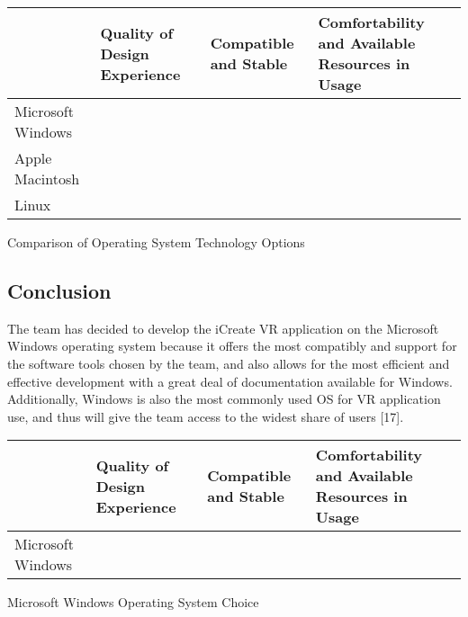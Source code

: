 \documentclass[letterpaper,10pt,onecolumn,compsoc]{IEEEtran}
\begin{document}

\begin{center}
\begin{tabular}{ | P{3.25cm} | P{4.5cm} | P{3.5cm} | P{4.5cm} | } 
 	\hline
 	 & Quality of Design Experience & Compatible and Stable & Comfortability and Available Resources in Usage \\ 
 	\hline
 	Microsoft Windows & & \checkmark & \checkmark \\ 
 	\hline
 	Apple Macintosh & \checkmark & &  \\ 
 	\hline
 	Linux & \checkmark &  & \\ 
 	\hline
\end{tabular}
\end{center}

\begin{center}
Comparison of Operating System Technology Options
\end{center}

\subsection{Conclusion}
The team has decided to develop the iCreate VR application on the Microsoft Windows operating system because it offers the most compatibly and support for the software tools chosen by the team, and also allows for the most efficient and effective development with a great deal of documentation available for Windows. Additionally, Windows is also the most commonly used OS for VR application use, and thus will give the team access to the widest share of users [17].


\begin{center}
\begin{tabular}{ | P{3.25cm} | P{4.5cm} | P{3.5cm} | P{4.5cm} | } 
 	\hline
 	 &  Quality of Design Experience & Compatible and Stable & Comfortability and Available Resources in Usage \\ 
 	\hline 		
 	Microsoft Windows &  & \checkmark & \checkmark \\ 
 	\hline
\end{tabular}
\end{center}

\begin{center}
Microsoft Windows Operating System Choice
\end{center}

\newpage
\end{document}
